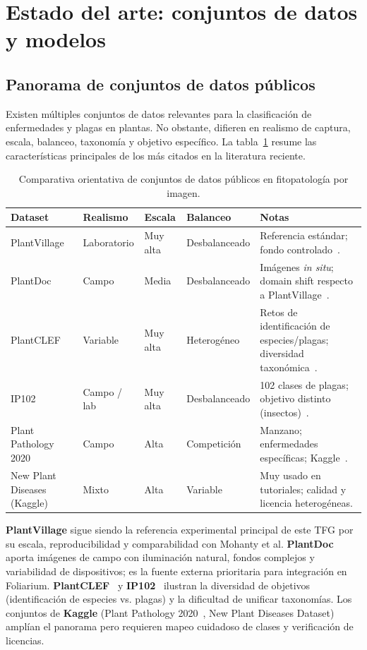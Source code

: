 \documentclass[11pt,spanish,listoffigures,listoftables]{tfgetsinf}
\begin{document}
\section{Estado del arte: conjuntos de datos y modelos}

\subsection{Panorama de conjuntos de datos públicos}

Existen múltiples conjuntos de datos relevantes para la clasificación de enfermedades y plagas en plantas. No obstante, difieren en realismo de captura, escala, balanceo, taxonomía y objetivo específico. La tabla~\ref{tab:datasets-fitopatologia} resume las características principales de los más citados en la literatura reciente.

\begin{table}[htbp]
\centering
\caption{Comparativa orientativa de conjuntos de datos públicos en fitopatología por imagen.}
\label{tab:datasets-fitopatologia}
\small
\begin{tabular}{p{2.8cm}p{1.6cm}p{1.4cm}p{2.2cm}p{4.5cm}}
\hline
\textbf{Dataset} & \textbf{Realismo} & \textbf{Escala} & \textbf{Balanceo} & \textbf{Notas} \\
\hline
PlantVillage & Laboratorio & Muy alta & Desbalanceado & Referencia estándar; fondo controlado~\cite{mohanty2016}. \\
PlantDoc & Campo & Media & Desbalanceado & Imágenes \textit{in situ}; domain shift respecto a PlantVillage~\cite{plantdoc2020}. \\
PlantCLEF & Variable & Muy alta & Heterogéneo & Retos de identificación de especies/plagas; diversidad taxonómica~\cite{plantclef2022}. \\
IP102 & Campo / lab & Muy alta & Desbalanceado & 102 clases de plagas; objetivo distinto (insectos)~\cite{ip1022019}. \\
Plant Pathology 2020 & Campo & Alta & Competición & Manzano; enfermedades específicas; Kaggle~\cite{plantpathology2020}. \\
New Plant Diseases (Kaggle) & Mixto & Alta & Variable & Muy usado en tutoriales; calidad y licencia heterogéneas. \\
\hline
\end{tabular}
\end{table}

\textbf{PlantVillage} sigue siendo la referencia experimental principal de este TFG por su escala, reproducibilidad y comparabilidad con Mohanty et al. \textbf{PlantDoc}~\cite{plantdoc2020} aporta imágenes de campo con iluminación natural, fondos complejos y variabilidad de dispositivos; es la fuente externa prioritaria para integración en Foliarium. \textbf{PlantCLEF}~\cite{plantclef2022} y \textbf{IP102}~\cite{ip1022019} ilustran la diversidad de objetivos (identificación de especies vs. plagas) y la dificultad de unificar taxonomías. Los conjuntos de \textbf{Kaggle} (Plant Pathology 2020~\cite{plantpathology2020}, New Plant Diseases Dataset) amplían el panorama pero requieren mapeo cuidadoso de clases y verificación de licencias.
\end{document}
